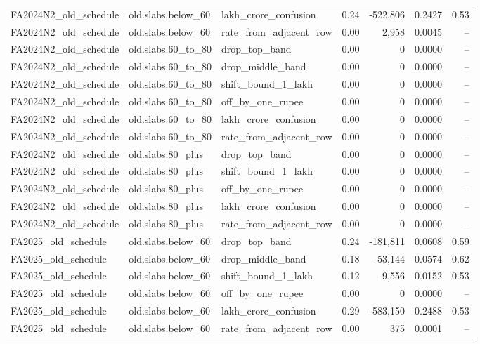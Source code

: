 \begin{table}[t]
\begin{tabular}{lllrrrr}
FA2024N2\_old\_schedule & old.slabs.below\_60 & lakh\_crore\_confusion & 0.24 & -522,806 & 0.2427 & 0.53 \\
FA2024N2\_old\_schedule & old.slabs.below\_60 & rate\_from\_adjacent\_row & 0.00 & 2,958 & 0.0045 & -- \\
FA2024N2\_old\_schedule & old.slabs.60\_to\_80 & drop\_top\_band & 0.00 & 0 & 0.0000 & -- \\
FA2024N2\_old\_schedule & old.slabs.60\_to\_80 & drop\_middle\_band & 0.00 & 0 & 0.0000 & -- \\
FA2024N2\_old\_schedule & old.slabs.60\_to\_80 & shift\_bound\_1\_lakh & 0.00 & 0 & 0.0000 & -- \\
FA2024N2\_old\_schedule & old.slabs.60\_to\_80 & off\_by\_one\_rupee & 0.00 & 0 & 0.0000 & -- \\
FA2024N2\_old\_schedule & old.slabs.60\_to\_80 & lakh\_crore\_confusion & 0.00 & 0 & 0.0000 & -- \\
FA2024N2\_old\_schedule & old.slabs.60\_to\_80 & rate\_from\_adjacent\_row & 0.00 & 0 & 0.0000 & -- \\
FA2024N2\_old\_schedule & old.slabs.80\_plus & drop\_top\_band & 0.00 & 0 & 0.0000 & -- \\
FA2024N2\_old\_schedule & old.slabs.80\_plus & shift\_bound\_1\_lakh & 0.00 & 0 & 0.0000 & -- \\
FA2024N2\_old\_schedule & old.slabs.80\_plus & off\_by\_one\_rupee & 0.00 & 0 & 0.0000 & -- \\
FA2024N2\_old\_schedule & old.slabs.80\_plus & lakh\_crore\_confusion & 0.00 & 0 & 0.0000 & -- \\
FA2024N2\_old\_schedule & old.slabs.80\_plus & rate\_from\_adjacent\_row & 0.00 & 0 & 0.0000 & -- \\
FA2025\_old\_schedule & old.slabs.below\_60 & drop\_top\_band & 0.24 & -181,811 & 0.0608 & 0.59 \\
FA2025\_old\_schedule & old.slabs.below\_60 & drop\_middle\_band & 0.18 & -53,144 & 0.0574 & 0.62 \\
FA2025\_old\_schedule & old.slabs.below\_60 & shift\_bound\_1\_lakh & 0.12 & -9,556 & 0.0152 & 0.53 \\
FA2025\_old\_schedule & old.slabs.below\_60 & off\_by\_one\_rupee & 0.00 & 0 & 0.0000 & -- \\
FA2025\_old\_schedule & old.slabs.below\_60 & lakh\_crore\_confusion & 0.29 & -583,150 & 0.2488 & 0.53 \\
FA2025\_old\_schedule & old.slabs.below\_60 & rate\_from\_adjacent\_row & 0.00 & 375 & 0.0001 & -- \\

\end{tabular}
\end{table}
